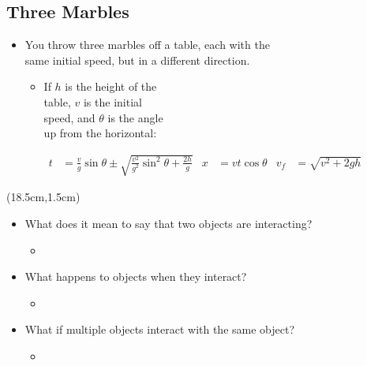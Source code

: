 \documentclass[]{article}
\begin{document}
\begin{PresentSpace}
\vspace{-10pt}
\section*{Three Marbles}
\vspace{-10pt}
\begin{itemize}
	\item You throw three marbles off a table, each with the \\
	same initial speed, but in a different direction.
	\vspace{1cm}
	\begin{itemize}
		\item If $h$ is the height of the \\
		table, $v$ is the initial \\
		speed, and $\theta$ is the angle \\
		up from the horizontal:
	\end{itemize}
\end{itemize}
\begin{align*}
	t & = \frac{v}{g}\sin\theta \pm \sqrt{\frac{v^{2}}{g^{2}}\sin^{2}\theta+\frac{2h}{g}} & x & = vt\cos\theta & v_{f} & = \sqrt{v^{2}+2gh}
\end{align*}
\end{PresentSpace}
\begin{textblock*}{10cm}(18.5cm,1.5cm)
	\Large
\end{textblock*}
\newpage
\begin{TeacherMargin}
\begin{itemize}
	\item What does it mean to say that two objects are interacting?
	\begin{itemize}
		\item 
	\end{itemize}
	\item What happens to objects when they interact?
	\begin{itemize}
		\item 
	\end{itemize}
	\item What if multiple objects interact with the same object?
	\begin{itemize}
		\item 
	\end{itemize}
\end{itemize}
\end{TeacherMargin}
\end{document}
